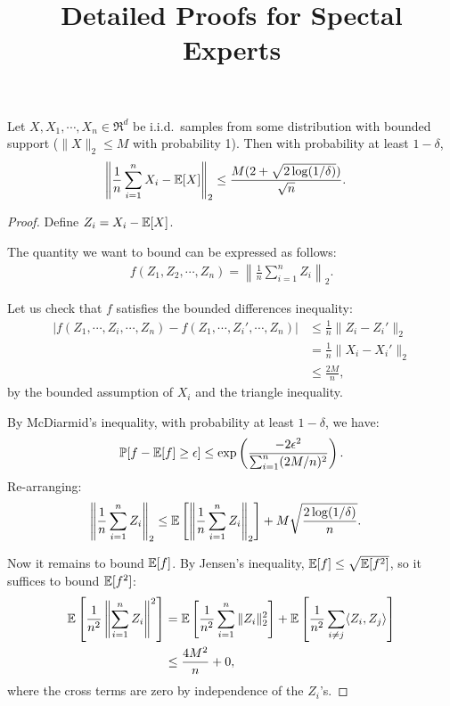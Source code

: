 \documentclass[tablecaption=bottom]{jmlr}
\title{Detailed Proofs for Spectal Experts}
\author{\Name{Arun Tejasvi Chaganty} \Email{chaganty@stanford.edu}}
\begin{document}
\maketitle

\begin{lemma}
  \label{lem:conc-norms}
  Let $X, X_1, \cdots, X_n \in \Re^d$ be i.i.d.\ samples
  from some distribution with bounded support
  ($\|X\|_2 \le M$ with probability 1).
  Then with probability at least $1 - \delta$,
  \begin{align}
    \left\| \frac{1}{n} \sum_{i=1}^{n} X_i - \operatorname{\mathbb{E}}[X] \right\|_2 &
    \le \frac{M(2 + \sqrt{2 \log(1/\delta)})}{\sqrt{n}}.
  \end{align}
\end{lemma}
\begin{proof}
  Define $Z_i = X_i - \operatorname{\mathbb{E}}[X]$.


The quantity we want to bound can be expressed as follows:
  \begin{align}
  f(Z_1, Z_2, \cdots, Z_n) = \left\| \frac1n \sum_{i=1}^n Z_i \right\|_2.
  \end{align}

Let us check that $f$ satisfies the bounded differences inequality:
  \begin{align}
|f(Z_1, \cdots, Z_i, \cdots, Z_n) - f(Z_1, \cdots, Z_i', \cdots, Z_n)|
& \le \frac1n \|Z_i - Z_i'\|_2 \\
& = \frac1n \|X_i - X_i'\|_2 \\
&\le \frac{2M}{n},
  \end{align}
  by the bounded assumption of $X_i$ and the triangle inequality.

By McDiarmid's inequality,
with probability at least $1 - \delta$,
we have:
\begin{align}
\mathbb{P}[f - \operatorname{\mathbb{E}}[f] \ge \epsilon] \le
\exp\left(\frac{-2 \epsilon^2}{\sum_{i=1}^n (2M/n)^2}\right).
\end{align}
Re-arranging:
\begin{align}
  \left\|\frac{1}{n}\sum_{i=1}^n Z_i\right\|_2
  &\le \operatorname{\mathbb{E}}\left[ \left\| \frac{1}{n} \sum_{i=1}^n Z_i \right\|_2 \right]
  + M\sqrt{\frac{2\log(1/\delta)}{n}}.
\end{align}

Now it remains to bound $\operatorname{\mathbb{E}}[f]$.
By Jensen's inequality, $\operatorname{\mathbb{E}}[f] \le \sqrt{\operatorname{\mathbb{E}}[f^2]}$,
so it suffices to bound $\operatorname{\mathbb{E}}[f^2]$:
\begin{align}
  \operatorname{\mathbb{E}}\left[ \frac1{n^2} \left\| \sum_{i=1}^n Z_i \right\|^2 \right]
  &= \operatorname{\mathbb{E}}\left[ \frac1{n^2} \sum_{i=1}^n \|Z_i\|_2^2 \right] +
\operatorname{\mathbb{E}}\left[ \frac1{n^2} \sum_{i\neq j} \langle Z_i, Z_j \rangle \right] \\ 
& \le \frac{4M^2}{n} + 0,
\end{align}
where the cross terms are zero by independence of the $Z_i$'s.


\end{proof}
\end{document}

